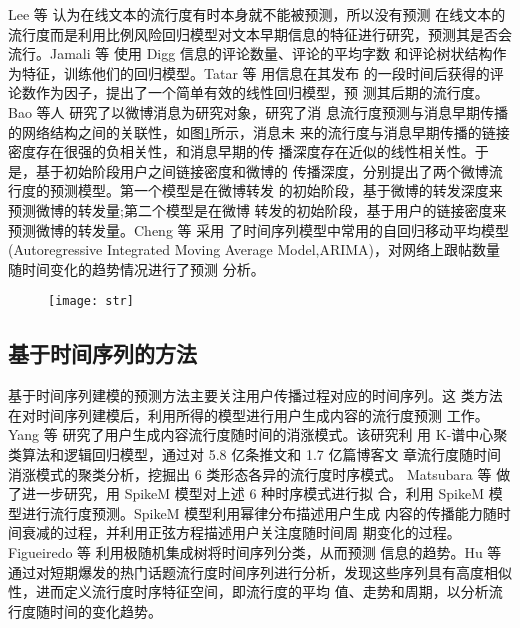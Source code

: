 Lee 等 \citep{Lee2010An}认为在线文本的流行度有时本身就不能被预测，所以没有预测 在线文本的流行度而是利用比例风险回归模型对文本早期信息的特征进行研究，预测其是否会流行。Jamali 等 \citep{Jamali2009Digging}使用 Digg 信息的评论数量、评论的平均字数 和评论树状结构作为特征，训练他们的回归模型。Tatar 等 \citep{Tatar2011Predicting}用信息在其发布 的一段时间后获得的评论数作为因子，提出了一个简单有效的线性回归模型，预 测其后期的流行度。Bao 等人 \citep{Bao2013Popularity,Gao2014Popularity}研究了以微博消息为研究对象，研究了消 息流行度预测与消息早期传播的网络结构之间的关联性，如图\ref{fig:str}所示，消息未 来的流行度与消息早期传播的链接密度存在很强的负相关性，和消息早期的传 播深度存在近似的线性相关性。于是，基于初始阶段用户之间链接密度和微博的 传播深度，分别提出了两个微博流行度的预测模型。第一个模型是在微博转发 的初始阶段，基于微博的转发深度来预测微博的转发量;第二个模型是在微博 转发的初始阶段，基于用户的链接密度来预测微博的转发量。Cheng 等 \citep{Cheng2008An}采用 了时间序列模型中常用的自回归移动平均模型 (Autoregressive Integrated Moving Average Model,ARIMA)，对网络上跟帖数量随时间变化的趋势情况进行了预测 分析。

 
 \begin{figure}[H]
    \centering
    \texttt{[image: str]}
    \label{fig:str}
\end{figure}

\subsection{基于时间序列的方法}
基于时间序列建模的预测方法主要关注用户传播过程对应的时间序列。这 类方法在对时间序列建模后，利用所得的模型进行用户生成内容的流行度预测 工作。Yang 等 \citep{Yang2011Patterns} 研究了用户生成内容流行度随时间的消涨模式。该研究利 用 K-谱中心聚类算法和逻辑回归模型，通过对 5.8 亿条推文和 1.7 亿篇博客文 章流行度随时间消涨模式的聚类分析，挖掘出 6 类形态各异的流行度时序模式。 Matsubara 等 \citep{Matsubara2012Rise}做了进一步研究，用 SpikeM 模型对上述 6 种时序模式进行拟 合，利用 SpikeM 模型进行流行度预测。SpikeM 模型利用幂律分布描述用户生成 内容的传播能力随时间衰减的过程，并利用正弦方程描述用户关注度随时间周 期变化的过程。Figueiredo 等 \citep{Figueiredo2014TrendLearner}利用极随机集成树将时间序列分类，从而预测 信息的趋势。Hu 等 \citep{Hu2016Predicting}通过对短期爆发的热门话题流行度时间序列进行分析，发现这些序列具有高度相似性，进而定义流行度时序特征空间，即流行度的平均 值、走势和周期，以分析流行度随时间的变化趋势。


